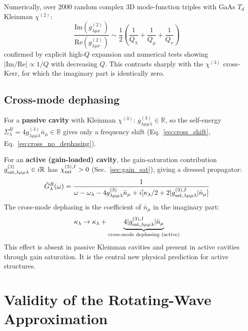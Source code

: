 \documentclass[12pt]{article}
\begin{document}
Numerically, over 2000 random complex 3D mode-function triples with GaAs
$T_d$ Kleinman $\chi^{(2)}$:
\begin{equation}
  \frac{\mathrm{Im}(g^{(2)}_{\lambda\mu\nu})}
  {\mathrm{Re}(g^{(2)}_{\lambda\mu\nu})}
  \sim \frac{1}{2}\!\left(\frac{1}{Q_\lambda}
  +\frac{1}{Q_\mu}+\frac{1}{Q_\nu}\right)
  \label{eq:g2_complex}
\end{equation}
confirmed by explicit high-$Q$ expansion and numerical tests showing
$|\mathrm{Im}/\mathrm{Re}| \propto 1/Q$ with decreasing $Q$.
This contrasts sharply with the $\chi^{(3)}$ cross-Kerr, for which the
imaginary part is identically zero.

\subsection{Cross-mode dephasing}
\label{sec:crossdephasing}

For a \textbf{passive cavity} with Kleinman $\chi^{(3)}$:
$g^{(3)}_{\lambda\mu\mu\lambda}\in\mathbb{R}$, so the self-energy
$\Sigma^R_\lambda = 4g^{(3)}_{\lambda\mu\mu\lambda}\bar{n}_\mu\in\mathbb{R}$
gives only a frequency shift (Eq.~\ref{eq:cross_shift},
Eq.~\ref{eq:cross_no_dephasing}).

For an \textbf{active (gain-loaded) cavity}, the gain-saturation
contribution $g^{(3)}_{\rm sat,\lambda\mu\mu\lambda}\in i\mathbb{R}$
has $\chi^{(3),I}_{\rm sat}>0$ (Sec.~\ref{sec:gain_sat}), giving a dressed
propagator:
\begin{equation}
  \tilde{G}_\lambda^R(\omega) =
  \frac{1}{\omega-\omega_\lambda
  -4g^{(3)}_{\lambda\mu\mu\lambda}\bar{n}_\mu
  +i[\kappa_\lambda/2
  +2|g^{(3),I}_{\rm sat,\lambda\mu\mu\lambda}|\bar{n}_\mu]}
  \label{eq:dressed_propagator}
\end{equation}
The cross-mode dephasing is the coefficient of $\bar{n}_\mu$ in the
imaginary part:
\begin{equation}
  \kappa_\lambda \to \kappa_\lambda
  +\underbrace{4|g^{(3),I}_{\rm sat,\lambda\mu\mu\lambda}|\bar{n}_\mu}_{
  \text{cross-mode dephasing (active)}}
  \label{eq:cross_dephasing}
\end{equation}
This effect is absent in passive Kleinman cavities and present in
active cavities through gain saturation.  It is the central new
physical prediction for active structures.

\section{Validity of the Rotating-Wave Approximation}
\label{sec:rwa}
\end{document}
